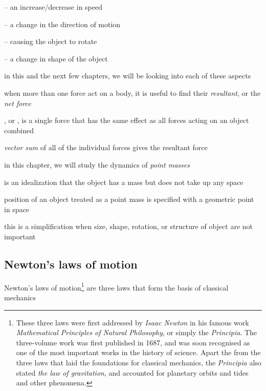 \begin{compactitem}
	\item[--] an increase/decrease in speed
	
	\item[--] a change in the direction of motion
	
	\item[--] causing the object to rotate
	
	\item[--] a change in shape of the object
\end{compactitem}

in this and the next few chapters, we will be looking into each of these aspects

\cmt when more than one force act on a body, it is useful to find their \emph{resultant}, or the \emph{net force}

\begin{ilight}
	, or , is a single force that has the same effect as all forces acting on an object combined
\end{ilight}

\emph{vector sum} of all of the individual forces gives the resultant force

\cmt in this chapter, we will study the dynamics of \emph{point masses}

 is an idealization that the object has a mass but does not take up any space

position of an object treated as a point mass is specified with a geometric point in space

this is a simplification when size, shape, rotation, or structure of object are not important




\subsection{Newton's laws of motion}

Newton's laws of motion\footnote{These three laws were first addressed by \emph{Isaac Newton} in his famous work \emph{Mathematical Principles of Natural Philosophy}, or simply the \emph{Principia}. The three-volume work was first published in 1687, and was soon recognised as one of the most important works in the history of science. Apart the from the three laws that laid the foundations for classical mechanics, the \emph{Principia} also stated \emph{the law of gravitation}, and accounted for planetary orbits and tides and other phenomena.} are three laws that form the basis of classical mechanics

